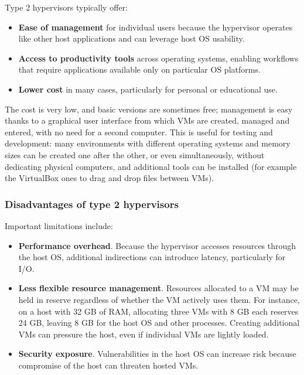 Type 2 hypervisors typically offer:

\begin{itemize}
\item \textbf{Ease of management} for individual users because the hypervisor operates like other host applications and can leverage host OS usability.
\item \textbf{Access to productivity tools} across operating systems, enabling workflows that require applications available only on particular OS platforms.
\item \textbf{Lower cost} in many cases, particularly for personal or educational use.
\end{itemize}

The cost is very low, and basic versions are sometimes free; management is easy thanks to a graphical user interface from which VMs are created, managed and entered, with no need for a second computer. This is useful for testing and development: many environments with different operating systems and memory sizes can be created one after the other, or even simultaneously, without dedicating physical computers, and additional tools can be installed (for example the VirtualBox ones to drag and drop files between VMs).

\subsubsection*{Disadvantages of type 2 hypervisors}

Important limitations include:

\begin{itemize}
\item \textbf{Performance overhead}. Because the hypervisor accesses resources through the host OS, additional indirections can introduce latency, particularly for I/O.
\item \textbf{Less flexible resource management}. Resources allocated to a VM may be held in reserve regardless of whether the VM actively uses them. For instance, on a host with 32 GB of RAM, allocating three VMs with 8 GB each reserves 24 GB, leaving 8 GB for the host OS and other processes. Creating additional VMs can pressure the host, even if individual VMs are lightly loaded.
\item \textbf{Security exposure}. Vulnerabilities in the host OS can increase risk because compromise of the host can threaten hosted VMs.
\end{itemize}

